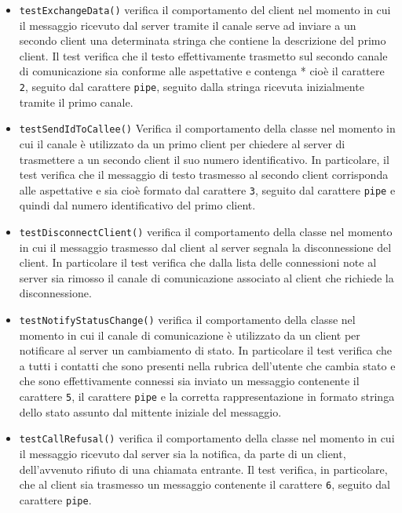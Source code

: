 \begin{itemize}
\begin{itemize}
\item \texttt{testExchangeData()} verifica il comportamento del client nel momento in cui il messaggio ricevuto dal server tramite il canale serve ad inviare a un secondo client una determinata stringa che contiene la descrizione del primo client. Il test verifica che il testo effettivamente trasmetto sul secondo canale di comunicazione sia conforme alle aspettative e contenga * cioè il carattere \texttt{2}, seguito dal carattere \texttt{pipe}, seguito dalla stringa ricevuta inizialmente tramite il primo canale.

\item \texttt{testSendIdToCallee()} Verifica il comportamento della classe nel momento in cui il canale è utilizzato da un primo client per chiedere al server di trasmettere a un secondo client il suo numero identificativo. In particolare, il test verifica che il messaggio di testo trasmesso al secondo client corrisponda alle aspettative e sia cioè formato dal carattere \texttt{3}, seguito dal carattere \texttt{pipe} e quindi dal numero identificativo del primo client.

\item \texttt{testDisconnectClient()} verifica il comportamento della classe nel momento in cui il messaggio trasmesso dal client al server segnala la disconnessione del client. In particolare il test verifica che dalla lista delle connessioni note al server sia rimosso il canale di comunicazione associato al client che richiede la disconnessione.

\item \texttt{testNotifyStatusChange()} verifica il comportamento della classe nel momento in cui il canale di comunicazione è utilizzato da un client per notificare al server un cambiamento di stato. In particolare il test verifica che a tutti i contatti che sono presenti nella rubrica dell'utente che cambia stato e che sono effettivamente connessi sia inviato un messaggio contenente il carattere \texttt{5}, il carattere \texttt{pipe} e la corretta rappresentazione in formato stringa dello stato assunto dal mittente iniziale del messaggio.

\item \texttt{testCallRefusal()} verifica il comportamento della classe nel momento in cui il messaggio  ricevuto dal server sia la notifica, da parte di un client, dell'avvenuto rifiuto di una chiamata entrante. Il test verifica, in particolare, che al client sia trasmesso un messaggio contenente il carattere \texttt{6}, seguito dal carattere \texttt{pipe}.


\end{itemize}
\end{itemize}
